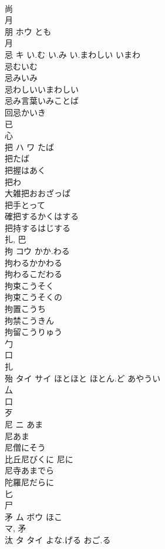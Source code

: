\documentclass[8pt]{extreport}
\begin{document}
\begin{CJK}{UTF8}{min}
\\	尚 
\\	月 
\\	朋	ホウ	とも	
\\	月 
\\	忌	キ	い.む い.み い.まわしい いまわ	
\\	忌むいむ
\\	忌みいみ
\\	忌わしいいまわしい
\\	忌み言葉いみことば
\\	回忌かいき
\\	已 
\\	心 
\\	把	ハ ワ	たば	
\\	把たば 
\\	把握はあく 
\\	把わ 
\\	大雑把おおざっぱ 
\\	把手とって 
\\	確把するかくはする 
\\	把持するはじする 
\\	扎, 巴 
\\	拘	コウ	かか.わる	
\\	拘わるかかわる
\\	拘わるこだわる
\\	拘束こうそく
\\	拘束こうそくの
\\	拘置こうち
\\	拘禁こうきん
\\	拘留こうりゅう
\\	勹 
\\	口 
\\	扎	
\\	殆	タイ サイ	ほとほと ほとん.ど あやうい	
\\	厶 
\\	口 
\\	歹 
\\	尼	ニ	あま	
\\	尼あま 
\\	尼僧にそう 
\\	比丘尼びくに 尼に 
\\	尼寺あまでら 
\\	陀羅尼だらに 
\\	匕 
\\	尸 
\\	矛	ム ボウ	ほこ	
\\	マ, 矛 
\\	汰	タ タイ	よな.げる おご.る	

\end{CJK}
\end{document}
